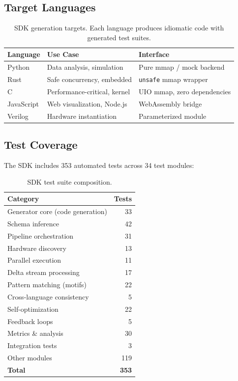 \documentclass[11pt,letterpaper]{article}
\theoremstyle{plain}
\theoremstyle{definition}
\theoremstyle{remark}
\begin{document}
\subsection{Target Languages}

\begin{table}[!htbp]
\centering
\caption{SDK generation targets. Each language produces idiomatic code with generated test suites.}
\label{tab:sdk-targets}
\begin{tabular}{@{}lll@{}}
\toprule
\textbf{Language} & \textbf{Use Case} & \textbf{Interface} \\
\midrule
Python     & Data analysis, simulation    & Pure mmap / mock backend \\
Rust       & Safe concurrency, embedded   & \texttt{unsafe} mmap wrapper \\
C          & Performance-critical, kernel & UIO mmap, zero dependencies \\
JavaScript & Web visualization, Node.js   & WebAssembly bridge \\
Verilog    & Hardware instantiation       & Parameterized module \\
\bottomrule
\end{tabular}
\end{table}

\subsection{Test Coverage}

The SDK includes 353 automated tests across 34 test modules:

\begin{table}[!htbp]
\centering
\caption{SDK test suite composition.}
\label{tab:sdk-tests}
\begin{tabular}{@{}lr@{}}
\toprule
\textbf{Category} & \textbf{Tests} \\
\midrule
Generator core (code generation) & 33 \\
Schema inference & 42 \\
Pipeline orchestration & 31 \\
Hardware discovery & 13 \\
Parallel execution & 11 \\
Delta stream processing & 17 \\
Pattern matching (motifs) & 22 \\
Cross-language consistency & 5 \\
Self-optimization & 22 \\
Feedback loops & 5 \\
Metrics \& analysis & 30 \\
Integration tests & 3 \\
Other modules & 119 \\
\midrule
\textbf{Total} & \textbf{353} \\
\bottomrule
\end{tabular}
\end{table}
\end{document}
